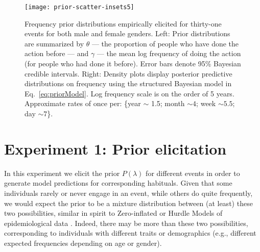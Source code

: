 \documentclass[10pt,letterpaper]{article}
\begin{document}
%
% 

\begin{figure}[t]
\centering
  \texttt{[image: prior-scatter-insets5]}
  \caption{Frequency prior distributions empirically elicited for thirty-one events for both male and female genders. Left: Prior distributions are summarized by $\theta$ --- the proportion of people who have done the action before --- and $\gamma$ --- the mean log frequency of doing the action (for people who had done it before).  Error bars denote 95\% Bayesian credible intervals.
  Right: Density plots display posterior predictive distributions on frequency using the structured Bayesian model in Eq.~\ref{eq:priorModel}. Log frequency scale is on the order of 5 years. Approximate rates of once per: \{year $\sim$ 1.5; month $\sim 4$; week $\sim 5.5$; day $\sim 7$\}. }
  \label{fig:priorScatter}
\end{figure}
%

\vspace{-0.5ex}

\section{Experiment 1: Prior elicitation}

%
In this experiment we elicit the prior $P(\lambda)$ for different events in order to generate model predictions for corresponding habituals.
Given that some individuals rarely or never engage in an event, while others do quite frequently, we would expect the prior to be a mixture distribution between (at least) these two possibilities, similar in spirit to Zero-inflated or Hurdle Models of epidemiological data \cite{hurdleModels}.
Indeed, there may be more than these two possibilities, corresponding to individuals with different traits or demographics (e.g., different expected frequencies depending on age or gender). 
\vspace{-1.0ex}
\end{document}
